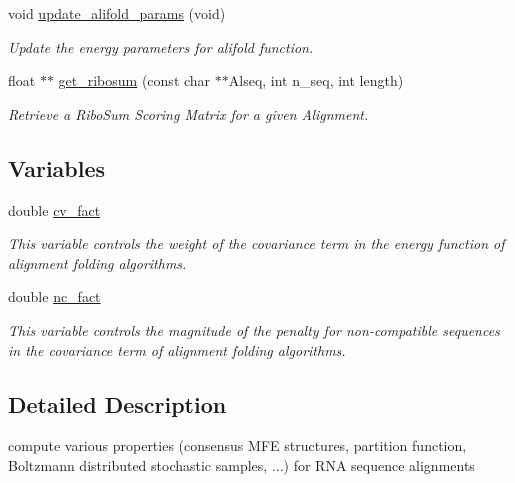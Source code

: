 \begin{DoxyCompactItemize}
void \hyperlink{group__consensus__fold_gac484c6bd429bafbd353b91044508d8e9}{update\+\_\+alifold\+\_\+params} (void)
\begin{DoxyCompactList}\small\item\em Update the energy parameters for alifold function. \end{DoxyCompactList}\item 
\mbox{\label{group__consensus__fold_ga1116aed4b2dab5252cd23946d47d52c3}} 
float $\ast$$\ast$ \hyperlink{group__consensus__fold_ga1116aed4b2dab5252cd23946d47d52c3}{get\+\_\+ribosum} (const char $\ast$$\ast$Alseq, int n\+\_\+seq, int length)
\begin{DoxyCompactList}\small\item\em Retrieve a Ribo\+Sum Scoring Matrix for a given Alignment. \end{DoxyCompactList}\end{DoxyCompactItemize}
\subsection*{Variables}
\begin{DoxyCompactItemize}
\item 
double \hyperlink{group__consensus__fold_gaf3cbac6ff5d706d6e414677841ddf94c}{cv\+\_\+fact}
\begin{DoxyCompactList}\small\item\em This variable controls the weight of the covariance term in the energy function of alignment folding algorithms. \end{DoxyCompactList}\item 
double \hyperlink{group__consensus__fold_ga502948a122a2af5b914355b1f3ea2f61}{nc\+\_\+fact}
\begin{DoxyCompactList}\small\item\em This variable controls the magnitude of the penalty for non-\/compatible sequences in the covariance term of alignment folding algorithms. \end{DoxyCompactList}\end{DoxyCompactItemize}


\subsection{Detailed Description}
compute various properties (consensus M\+FE structures, partition function, Boltzmann distributed stochastic samples, ...) for R\+NA sequence alignments 

